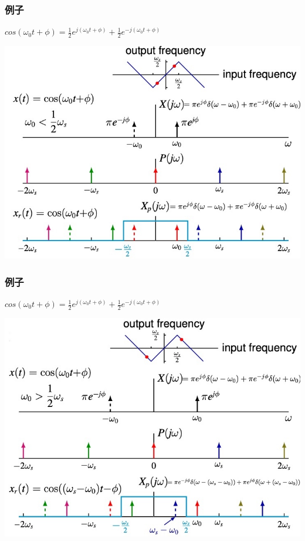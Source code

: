 \documentclass[CJKutf8,dvipsnames,table]{beamer}
\begin{document}
\begin{CJK*}{UTF8}{song}
\begin{frame}
  \end{frame}   

  \begin{frame}
    \frametitle{例子}
	$cos(\omega_0 t + \phi) = \frac{1}{2}e^{j(\omega_0 t+ \phi)}+\frac{1}{2}e^{-j(\omega_0 t+ \phi)}	$

    \begin{center}
    \includegraphics[scale=.42]{aliasing-example-2}
    \end{center}

  \end{frame}   
  
  \begin{frame}
    \frametitle{例子}
	$cos(\omega_0 t + \phi) = \frac{1}{2}e^{j(\omega_0 t+ \phi)}+\frac{1}{2}e^{-j(\omega_0 t+ \phi)}	$

    \begin{center}
    \includegraphics[scale=.42]{aliasing-example-3}
    \end{center}


\end{frame}
\end{CJK*}
\end{document}
